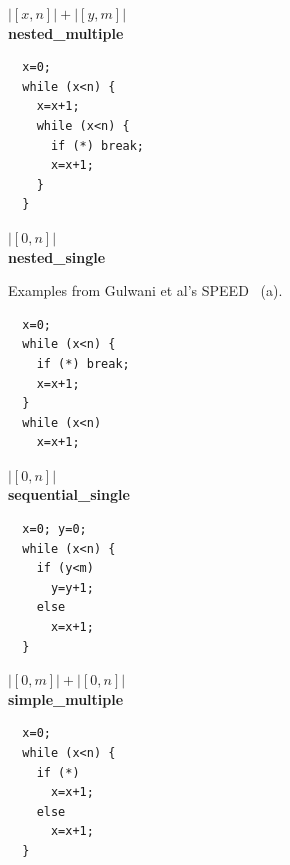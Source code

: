 \documentclass{sigplanconf}
\begin{document}
{\begin{figure}
\begin{minipage}[b]{\progwidth}
\begin{center}
$|[x, n]| + |[y, m]|$
\\[.7\baselineskip]
      {\bf nested\_multiple}
    \end{center}
  \end{minipage}
%
%
  \begin{minipage}[b]{\progwidth}
    \begin{center}
   \begin{lstlisting}
  x=0;
  while (x<n) {
    x=x+1;
    while (x<n) {
      if (*) break;
      x=x+1;
    }
  }
   \end{lstlisting}

$|[0, n]|$
\\[.7\baselineskip]
      {\bf nested\_single}
    \end{center}
  \end{minipage}

   \caption{Examples from Gulwani et al's SPEED~\cite{GulwaniMC09} (a).}
  \label{fig:cat2a}
\end{figure}

\begin{figure}
 \setlength{\progwidth}{.24\linewidth}
  \centering
  \begin{minipage}[b]{\progwidth}
    \begin{center}
   \begin{lstlisting}
  x=0;
  while (x<n) {
    if (*) break;
    x=x+1;
  }
  while (x<n)
    x=x+1;
   \end{lstlisting}

$|[0,n]|$
\\[.7\baselineskip]
      {\bf sequential\_single}
    \end{center}
  \end{minipage}
%
%
  \begin{minipage}[b]{\progwidth}
    \begin{center}
   \begin{lstlisting}
  x=0; y=0;
  while (x<n) {
    if (y<m)
      y=y+1;
    else
      x=x+1;
  }
   \end{lstlisting}
$|[0, m]| + |[0, n]|$
\\[.7\baselineskip]
      {\bf simple\_multiple}
    \end{center}
  \end{minipage}
%
%
  \begin{minipage}[b]{\progwidth}
    \begin{center}
   \begin{lstlisting}
  x=0;
  while (x<n) {
    if (*)
      x=x+1;
    else
      x=x+1;
  }
   \end{lstlisting}


\end{center}
\end{minipage}
\end{figure}}
\end{document}
